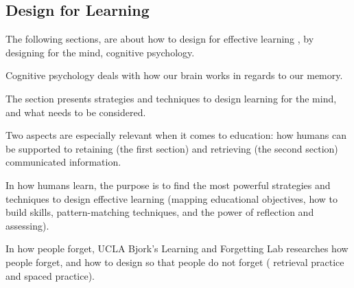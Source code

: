 \subsection{Design for Learning}


The following sections, are about how to design for effective learning \citep{dirksen}, by designing for the mind, cognitive psychology. %

Cognitive psychology deals with how our brain works in regards to our memory.

The section presents strategies and techniques to design learning for the mind, and what needs to be considered.

Two aspects are especially relevant when it comes to education: how humans can be supported to retaining (the first section) and retrieving (the second section) communicated information.

In how humans learn, the purpose is to find the most powerful strategies and techniques to design effective learning (mapping educational objectives, how to build skills, pattern-matching techniques, and the power of reflection and assessing).

In how people forget, UCLA Bjork's Learning and Forgetting Lab \citep{bjork} researches how people forget, and how to design so that people do not forget ( retrieval practice and spaced practice).




